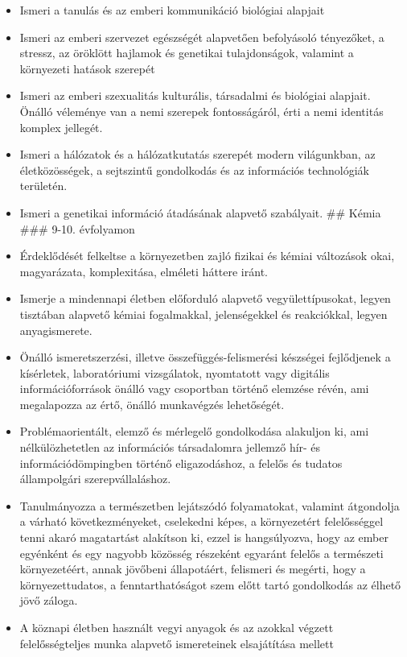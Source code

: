 \begin{itemize}
\item
  Ismeri a tanulás és az emberi kommunikáció biológiai alapjait
\item
  Ismeri az emberi szervezet egészségét alapvetően befolyásoló
  tényezőket, a stressz, az öröklött hajlamok és genetikai
  tulajdonságok, valamint a környezeti hatások szerepét
\item
  Ismeri az emberi szexualitás kulturális, társadalmi és biológiai
  alapjait. Önálló véleménye van a nemi szerepek fontosságáról, érti a
  nemi identitás komplex jellegét.
\item
  Ismeri a hálózatok és a hálózatkutatás szerepét modern világunkban, az
  életközösségek, a sejtszintű gondolkodás és az információs
  technológiák területén.
\item
  Ismeri a genetikai információ átadásának alapvető szabályait. \#\#
  Kémia \#\#\# 9-10. évfolyamon
\item
  Érdeklődését felkeltse a környezetben zajló fizikai és kémiai
  változások okai, magyarázata, komplexitása, elméleti háttere iránt.
\item
  Ismerje a mindennapi életben előforduló alapvető vegyülettípusokat,
  legyen tisztában alapvető kémiai fogalmakkal, jelenségekkel és
  reakciókkal, legyen anyagismerete.
\item
  Önálló ismeretszerzési, illetve összefüggés-felismerési készségei
  fejlődjenek a kísérletek, laboratóriumi vizsgálatok, nyomtatott vagy
  digitális információforrások önálló vagy csoportban történő elemzése
  révén, ami megalapozza az értő, önálló munkavégzés lehetőségét.
\item
  Problémaorientált, elemző és mérlegelő gondolkodása alakuljon ki, ami
  nélkülözhetetlen az információs társadalomra jellemző hír- és
  információdömpingben történő eligazodáshoz, a felelős és tudatos
  állampolgári szerepvállaláshoz.
\item
  Tanulmányozza a természetben lejátszódó folyamatokat, valamint
  átgondolja a várható következményeket, cselekedni képes, a
  környezetért felelősséggel tenni akaró magatartást alakítson ki, ezzel
  is hangsúlyozva, hogy az ember egyénként és egy nagyobb közösség
  részeként egyaránt felelős a természeti környezetéért, annak jövőbeni
  állapotáért, felismeri és megérti, hogy a környezettudatos, a
  fenntarthatóságot szem előtt tartó gondolkodás az élhető jövő záloga.
\item
  A köznapi életben használt vegyi anyagok és az azokkal végzett
  felelősségteljes munka alapvető ismereteinek elsajátítása mellett

\end{itemize}
